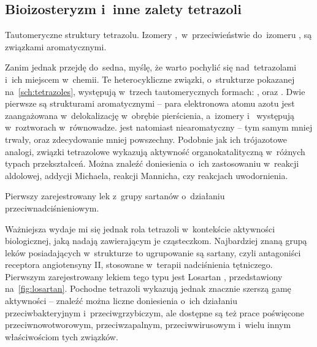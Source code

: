 \subsection{Bioizosteryzm i~inne zalety tetrazoli}\label{synthesis:sugars:bioisosterizm}
\begin{marginscheme}
  
  \caption{
    Tautomeryczne struktury tetrazolu.
    Izomery ,~w~przeciwieństwie
      do~izomeru , są związkami aromatycznymi.
  } \label{sch:tetrazoles}
\end{marginscheme}
Zanim jednak przejdę do~sedna, myślę, że warto pochylić się nad~tetrazolami i~ich miejscem w~chemii.
Te heterocykliczne związki, o~strukturze pokazanej na~\cref{sch:tetrazoles},
  występują w~trzech tautomerycznych formach: \iupac{1\H-}, \iupac{2\H-} oraz \iupac{5\H-}.
Dwie pierwsze są strukturami aromatycznymi \--- para elektronowa atomu azotu jest
  zaangażowana w~delokalizację w~obrębie pierścienia, a~izomery \iupac{1\H-} i~\iupac{2\H-}
  występują w~roztworach w~równowadze.
 jest natomiast niearomatyczny \--- tym samym mniej trwały,
  oraz zdecydowanie mniej powszechny.
Podobnie jak ich trójazotowe analogi, związki tetrazolowe wykazują aktywność
  organokatalityczną w~różnych typach przekształceń.
Można znaleźć doniesienia o~ich zastosowaniu w~reakcji aldolowej,
  addycji Michaela, reakcji Mannicha,
  czy reakcjach uwodornienia.

\begin{marginfigure}
  
  \caption{Pierwszy zarejestrowany lek z~grupy sartanów o~działaniu przeciwnadciśnieniowym.}
  \label{fig:losartan}
\end{marginfigure}
Ważniejsza wydaje mi się jednak rola tetrazoli w~kontekście aktywności biologicznej,
  jaką nadają zawierającym je cząsteczkom.
Najbardziej znaną grupą leków posiadających w~strukturze to ugrupowanie są sartany,
  czyli antagoniści receptora angiotensyny II, stosowane w~terapii nadciśnienia tętniczego.
Pierwszym zarejestrowany lekiem tego typu jest Losartan ,
  przedstawiony na~\cref{fig:losartan}.
Pochodne tetrazoli wykazują jednak znacznie szerszą gamę aktywności \---
  znaleźć można liczne doniesienia o~ich działaniu przeciwbakteryjnym i~przeciwgrzybiczym,
  ale dostępne są też prace poświęcone przeciwnowotworowym, przeciwzapalnym, przeciwwirusowym
  i~wielu innym właściwościom tych związków.


